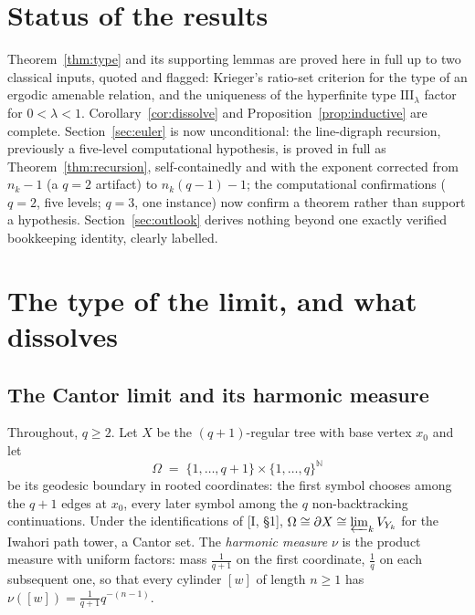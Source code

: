 \documentclass[11pt]{amsart}
\numberwithin{equation}{section}
\theoremstyle{definition}
\theoremstyle{remark}
\newcommand{\N}{\mathbb{N}}
\begin{document}
\maketitle

\section*{Status of the results}

Theorem~\ref{thm:type} and its supporting lemmas are proved here in full up to two
classical inputs, quoted and flagged: Krieger's ratio-set criterion for the type of an
ergodic amenable relation, and the uniqueness of the hyperfinite type
$\mathrm{III}_\lambda$ factor for $0<\lambda<1$. Corollary~\ref{cor:dissolve} and
Proposition~\ref{prop:inductive} are complete. Section~\ref{sec:euler} is now
unconditional: the line-digraph recursion, previously a five-level computational
hypothesis, is proved in full as Theorem~\ref{thm:recursion}, self-containedly and
with the exponent corrected from $n_k-1$ (a $q=2$ artifact) to $n_k(q-1)-1$; the
computational confirmations ($q=2$, five levels; $q=3$, one instance) now confirm a
theorem rather than support a hypothesis. Section~\ref{sec:outlook} derives nothing
beyond one exactly verified bookkeeping identity, clearly labelled.

\section{The type of the limit, and what dissolves}\label{sec:type}

\subsection{The Cantor limit and its harmonic measure}

Throughout, $q\ge2$. Let $X$ be the $(q+1)$-regular tree with base vertex $x_0$ and let
\[
\Omega\;=\;\{1,\dots,q+1\}\times\{1,\dots,q\}^{\N}
\]
be its geodesic boundary in rooted coordinates: the first symbol chooses among the
$q+1$ edges at $x_0$, every later symbol among the $q$ non-backtracking continuations.
Under the identifications of [I, \S1], $\Omega\cong\partial X\cong\varprojlim_kV_{Y_k}$
for the Iwahori path tower, a Cantor set. The \emph{harmonic measure} $\nu$ is the
product measure with uniform factors: mass $\tfrac1{q+1}$ on the first coordinate,
$\tfrac1q$ on each subsequent one, so that every cylinder $[w]$ of length $n\ge1$ has
$\nu([w])=\tfrac1{q+1}q^{-(n-1)}$.
\end{document}
